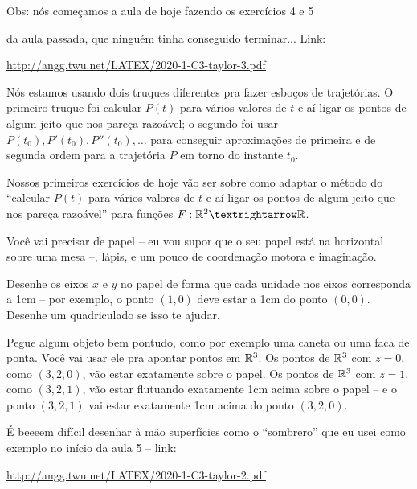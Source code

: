 \documentclass[oneside,12pt]{article}
\begin{document}
{\footnotesize

Obs: nós começamos a aula de hoje fazendo os exercícios 4 e 5

da aula passada, que ninguém tinha conseguido terminar... Link:

\ssk

\url{http://angg.twu.net/LATEX/2020-1-C3-taylor-3.pdf}

}

\newpage

Nós estamos usando dois truques diferentes pra fazer esboços de
trajetórias. O primeiro truque foi calcular $P(t)$ para vários valores
de $t$ e aí ligar os pontos de algum jeito que nos pareça razoável; o
segundo foi usar $P(t_0), P'(t_0), P''(t_0), \ldots$ para conseguir
aproximações de primeira e de segunda ordem para a trajetória $P$ em
torno do instante $t_0$.

Nossos primeiros exercícios de hoje vão ser sobre como adaptar o
método do ``calcular $P(t)$ para vários valores de $t$ e aí ligar os
pontos de algum jeito que nos pareça razoável'' para funções
$F:\R^2→\R$.

Você vai precisar de papel -- eu vou supor que o seu papel está na
horizontal sobre uma mesa --, lápis, e um pouco de coordenação motora
e imaginação.

Desenhe os eixos $x$ e $y$ no papel de forma que cada unidade nos
eixos corresponda a 1cm -- por exemplo, o ponto $(1,0)$ deve estar a
1cm do ponto $(0,0)$. Desenhe um quadriculado se isso te ajudar.

\newpage


Pegue algum objeto bem pontudo, como por exemplo uma caneta ou uma
faca de ponta. Você vai usar ele pra apontar pontos em $\mathbb{R}^3$.
 Os pontos
de $\mathbb{R}^3$ com $z=0$, como $(3,2,0)$, vão estar exatamente sobre o
papel. Os pontos de $\mathbb{R}^3$ com $z=1$, como $(3,2,1)$, vão estar
flutuando exatamente 1cm acima sobre o papel -- e o ponto $(3,2,1)$
vai estar exatamente 1cm acima do ponto $(3,2,0)$.

É beeeem difícil desenhar à mão superfícies como o ``sombrero'' que eu
usei como exemplo no início da aula 5 -- link:

\ssk

\url{http://angg.twu.net/LATEX/2020-1-C3-taylor-2.pdf}

\ssk
\end{document}
